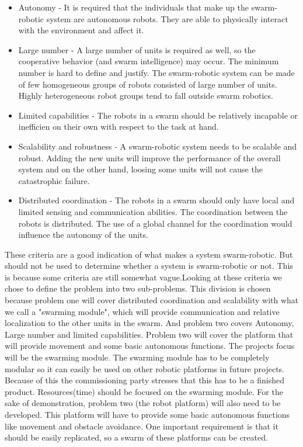 \documentclass[10pt,a4paper]{article}
\begin{document}
\begin{itemize}
	\item Autonomy - It is required that the individuals that make up 	the swarm-robotic system are autonomous robots. They are able to 		physically 		interact with the environment and affect it.
	\item Large number - A large number of units is required
	as well, so the cooperative behavior (and
	swarm intelligence) may occur. The minimum number
	is hard to define and justify. The swarm-robotic
	system can be made of few homogeneous groups of
	robots consisted of large number of units. Highly heterogeneous
	robot groups tend to fall outside swarm
	robotics.
	\item Limited capabilities - The robots in a swarm
	should be relatively incapable or inefficien on their
	own with respect to the task at hand.
	\item Scalability and robustness - A swarm-robotic
	system needs to be scalable and robust. Adding the
	new units will improve the performance of the overall
	system and on the other hand, loosing some units will
	not cause the catastrophic failure.
	\item Distributed coordination - The robots in a swarm
	should only have local and limited sensing and communication
	abilities. The coordination between the
	robots is distributed. The use of a global channel for
	the coordination would influence the autonomy of the
	units.
\end{itemize}

These criteria are a good indication of what makes a system swarm-robotic. But should not be used to determine whether a system is swarm-robotic or not. This is because some criteria are still somewhat vague\cite{swarmintelligence}.Looking at these criteria we chose to define the problem into two sub-problems. This division is chosen because problem one will cover distributed coordination and scalability with what we call a "swarming module", which will provide communication and relative localization to the other units in the swarm. And problem two covers Autonomy, Large number and limited capabilities.  Problem two will cover the platform that will provide movement and some basic autonomous functions. The projects focus will be the swarming module. The swarming module has to be completely modular so it can easily be used on other robotic platforms in future projects. Because of this the commissioning party stresses that this has to be a finished product. Resources(time) should be focused on the swarming module. For the sake of demonstration, problem two (the robot platform) will also need to be developed. This platform will have to provide some basic autonomous functions like movement and obstacle avoidance. One important requirement is that it should be easily replicated, so a swarm of these platforms can be created.\\
\end{document}
